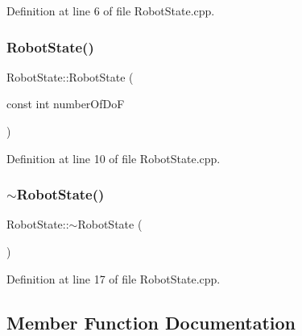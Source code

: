 Definition at line 6 of file Robot\+State.\+cpp.

\hypertarget{classocra__recipes_1_1RobotState_ae6462774d46dadc364bc936f61bde768}{}\label{classocra__recipes_1_1RobotState_ae6462774d46dadc364bc936f61bde768} 
\subsubsection{\texorpdfstring{Robot\+State()}{RobotState()}\hspace{0.1cm}{\footnotesize\ttfamily [2/2]}}
{\footnotesize\ttfamily Robot\+State\+::\+Robot\+State (\begin{DoxyParamCaption}\item[{const int}]{number\+Of\+DoF }\end{DoxyParamCaption})}



Definition at line 10 of file Robot\+State.\+cpp.

\hypertarget{classocra__recipes_1_1RobotState_a86cf2dc3aef7d924f89d5b3e5467ea8a}{}\label{classocra__recipes_1_1RobotState_a86cf2dc3aef7d924f89d5b3e5467ea8a} 
\subsubsection{\texorpdfstring{$\sim$\+Robot\+State()}{~RobotState()}}
{\footnotesize\ttfamily Robot\+State\+::$\sim$\+Robot\+State (\begin{DoxyParamCaption}{ }\end{DoxyParamCaption})\hspace{0.3cm}{\ttfamily [virtual]}}



Definition at line 17 of file Robot\+State.\+cpp.



\subsection{Member Function Documentation}
\hypertarget{classocra__recipes_1_1RobotState_a98e0e09ec0829542fab9037f6c8f6301}{}\label{classocra__recipes_1_1RobotState_a98e0e09ec0829542fab9037f6c8f6301} 

